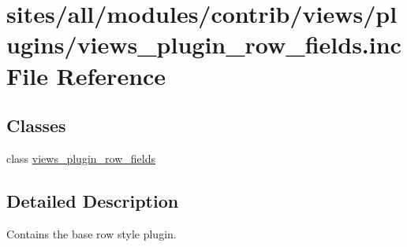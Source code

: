 \hypertarget{views__plugin__row__fields_8inc}{
\section{sites/all/modules/contrib/views/plugins/views\_\-plugin\_\-row\_\-fields.inc File Reference}
\label{views__plugin__row__fields_8inc}
}
\subsection*{Classes}
\begin{CompactItemize}
\item 
class \hyperlink{classviews__plugin__row__fields}{views\_\-plugin\_\-row\_\-fields}
\end{CompactItemize}


\subsection{Detailed Description}
Contains the base row style plugin. 
